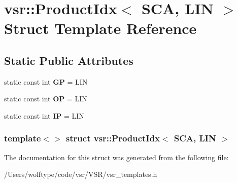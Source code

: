 \hypertarget{structvsr_1_1_product_idx_3_01_s_c_a_00_01_l_i_n_01_4}{\section{vsr\-:\-:Product\-Idx$<$ S\-C\-A, L\-I\-N $>$ Struct Template Reference}
\label{structvsr_1_1_product_idx_3_01_s_c_a_00_01_l_i_n_01_4}
}
\subsection*{Static Public Attributes}
\begin{DoxyCompactItemize}
\item 
\hypertarget{structvsr_1_1_product_idx_3_01_s_c_a_00_01_l_i_n_01_4_ad86fc24a8b1427deb0cf9fc338c4606c}{static const int {\bfseries G\-P} = L\-I\-N}\label{structvsr_1_1_product_idx_3_01_s_c_a_00_01_l_i_n_01_4_ad86fc24a8b1427deb0cf9fc338c4606c}

\item 
\hypertarget{structvsr_1_1_product_idx_3_01_s_c_a_00_01_l_i_n_01_4_a8ec5a780b6c63a44c4aa3a61e0588121}{static const int {\bfseries O\-P} = L\-I\-N}\label{structvsr_1_1_product_idx_3_01_s_c_a_00_01_l_i_n_01_4_a8ec5a780b6c63a44c4aa3a61e0588121}

\item 
\hypertarget{structvsr_1_1_product_idx_3_01_s_c_a_00_01_l_i_n_01_4_a6f2ceb07d7587f9b87936d6d39a4a0ea}{static const int {\bfseries I\-P} = L\-I\-N}\label{structvsr_1_1_product_idx_3_01_s_c_a_00_01_l_i_n_01_4_a6f2ceb07d7587f9b87936d6d39a4a0ea}

\end{DoxyCompactItemize}
\subsubsection*{template$<$$>$ struct vsr\-::\-Product\-Idx$<$ S\-C\-A, L\-I\-N $>$}



The documentation for this struct was generated from the following file\-:\begin{DoxyCompactItemize}
\item 
/\-Users/wolftype/code/vsr/\-V\-S\-R/vsr\-\_\-templates.\-h\end{DoxyCompactItemize}
